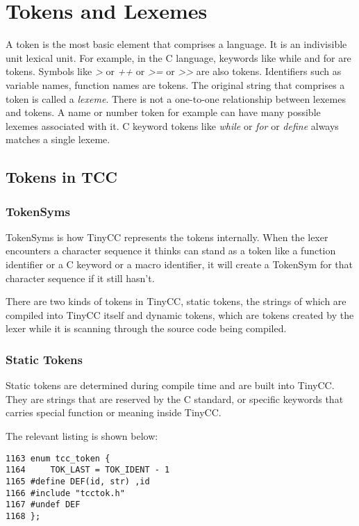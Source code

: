 
\chapter{Tokens and Lexemes}

A token is the most basic element that comprises a language. It is an indivisible unit lexical unit. For example, in the C language, keywords like while and for are tokens. Symbols like \emph{>} or \emph{++} or \emph{>=} or \emph{>>} are also tokens. Identifiers such as variable names, function names are tokens. The original string that comprises a token is called a \emph{lexeme}. There is not a one-to-one relationship between lexemes and tokens. A name or number token for example can have many possible lexemes associated with it. C keyword tokens like \emph{while} or \emph{for} or \emph{define} always matches a single lexeme. 

\section{Tokens in TCC}

\subsection{TokenSyms}

TokenSyms is how TinyCC represents the tokens internally. When the lexer encounters a character sequence it thinks can stand as a token like a function identifier or a C keyword or a macro identifier, it will create a TokenSym for that character sequence if it still hasn't.

There are two kinds of tokens in TinyCC, static tokens, the strings of which are compiled into TinyCC itself and dynamic tokens, which are tokens created by the lexer while it is scanning through the source code being compiled.

\subsection{Static Tokens}
Static tokens are determined during compile time and are built into TinyCC. They are strings that are reserved by the C standard, or specific keywords that carries special function or meaning inside TinyCC.

The relevant listing is shown below:
\begin{verbatim}
1163 enum tcc_token {
1164     TOK_LAST = TOK_IDENT - 1
1165 #define DEF(id, str) ,id
1166 #include "tcctok.h"
1167 #undef DEF
1168 };
\end{verbatim}

